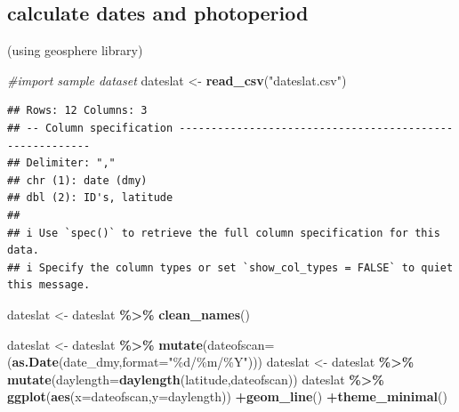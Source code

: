 \documentclass[
]{article}
\newenvironment{Shaded}{\begin{snugshade}}{\end{snugshade}}
\newcommand{\AttributeTok}[1]{\textcolor[rgb]{0.13,0.29,0.53}{#1}}
\newcommand{\CommentTok}[1]{\textcolor[rgb]{0.56,0.35,0.01}{\textit{#1}}}
\newcommand{\FunctionTok}[1]{\textcolor[rgb]{0.13,0.29,0.53}{\textbf{#1}}}
\newcommand{\NormalTok}[1]{#1}
\newcommand{\OtherTok}[1]{\textcolor[rgb]{0.56,0.35,0.01}{#1}}
\newcommand{\SpecialCharTok}[1]{\textcolor[rgb]{0.81,0.36,0.00}{\textbf{#1}}}
\newcommand{\StringTok}[1]{\textcolor[rgb]{0.31,0.60,0.02}{#1}}
\begin{document}
\hypertarget{calculate-dates-and-photoperiod}{%
\subsection{calculate dates and photoperiod}\label{calculate-dates-and-photoperiod}}

(using geosphere library)

\begin{Shaded}
\begin{Highlighting}[]
\CommentTok{\#import sample dataset}
\NormalTok{dateslat }\OtherTok{\textless{}{-}} \FunctionTok{read\_csv}\NormalTok{(}\StringTok{"dateslat.csv"}\NormalTok{)}
\end{Highlighting}
\end{Shaded}

\begin{verbatim}
## Rows: 12 Columns: 3
## -- Column specification --------------------------------------------------------
## Delimiter: ","
## chr (1): date (dmy)
## dbl (2): ID's, latitude
## 
## i Use `spec()` to retrieve the full column specification for this data.
## i Specify the column types or set `show_col_types = FALSE` to quiet this message.
\end{verbatim}

\begin{Shaded}
\begin{Highlighting}[]
\NormalTok{dateslat }\OtherTok{\textless{}{-}}\NormalTok{ dateslat }\SpecialCharTok{\%\textgreater{}\%}
  \FunctionTok{clean\_names}\NormalTok{()}

\NormalTok{dateslat }\OtherTok{\textless{}{-}}\NormalTok{ dateslat }\SpecialCharTok{\%\textgreater{}\%} \FunctionTok{mutate}\NormalTok{(}\AttributeTok{dateofscan=}\NormalTok{(}\FunctionTok{as.Date}\NormalTok{(date\_dmy,}\AttributeTok{format=}\StringTok{"\%d/\%m/\%Y"}\NormalTok{)))}
\NormalTok{dateslat }\OtherTok{\textless{}{-}}\NormalTok{ dateslat }\SpecialCharTok{\%\textgreater{}\%} \FunctionTok{mutate}\NormalTok{(}\AttributeTok{daylength=}\FunctionTok{daylength}\NormalTok{(latitude,dateofscan))}
\NormalTok{dateslat }\SpecialCharTok{\%\textgreater{}\%} \FunctionTok{ggplot}\NormalTok{(}\FunctionTok{aes}\NormalTok{(}\AttributeTok{x=}\NormalTok{dateofscan,}\AttributeTok{y=}\NormalTok{daylength)) }\SpecialCharTok{+}\FunctionTok{geom\_line}\NormalTok{() }\SpecialCharTok{+}\FunctionTok{theme\_minimal}\NormalTok{()}
\end{Highlighting}
\end{Shaded}
\end{document}
